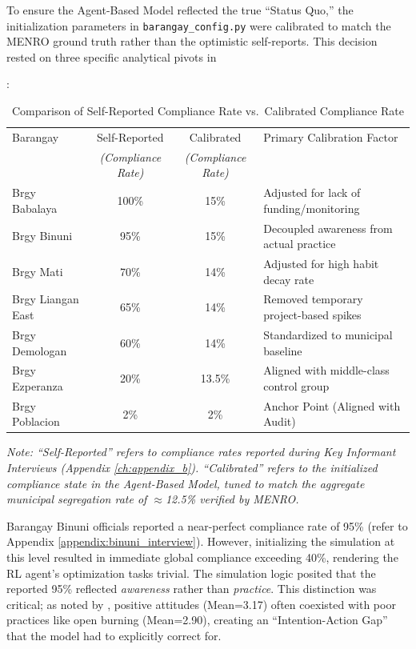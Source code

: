 To ensure the Agent-Based Model reflected the true ``Status Quo,'' the initialization parameters in \texttt{barangay\_config.py} were calibrated to match the MENRO ground truth rather than the optimistic self-reports. This decision rested on three specific analytical pivots in \begin{table}

\end{table}:

\begin{table}[htbp]
    \centering
    \caption{Comparison of Self-Reported Compliance Rate vs.\ Calibrated Compliance Rate}
    \label{tab:calibration_data}
    \small
    \begin{tabular}{l c c p{5cm}}
        \toprule
        Barangay & Self-Reported & Calibrated & Primary Calibration Factor \\
         & \textit{(Compliance Rate)} & \textit{(Compliance Rate)} & \\
        \midrule
        Brgy Babalaya     & 100\% & 15\% & Adjusted for lack of funding/monitoring \\
        Brgy Binuni       & 95\%  & 15\% & Decoupled awareness from actual practice \\
        Brgy Mati         & 70\%  & 14\% & Adjusted for high habit decay rate \\
        Brgy Liangan East & 65\%  & 14\% & Removed temporary project-based spikes \\
        Brgy Demologan    & 60\%  & 14\% & Standardized to municipal baseline \\
        Brgy Ezperanza    & 20\%  & 13.5\% & Aligned with middle-class control group \\
        Brgy Poblacion    & 2\%   & 2\%  & Anchor Point (Aligned with Audit) \\
        \bottomrule
    \end{tabular}
    
    \vspace{1ex}
    \raggedright
    \footnotesize
    \textit{Note: ``Self-Reported'' refers to compliance rates reported during Key Informant Interviews (Appendix \ref{ch:appendix_b}). ``Calibrated'' refers to the initialized compliance state in the Agent-Based Model, tuned to match the aggregate municipal segregation rate of $\approx$12.5\% verified by MENRO.}
\end{table}

Barangay Binuni officials reported a near-perfect compliance rate of 95\% (refer to Appendix \ref{appendix:binuni_interview}). However, initializing the simulation at this level resulted in immediate global compliance exceeding 40\%, rendering the RL agent’s optimization tasks trivial. The simulation logic posited that the reported 95\% reflected \textit{awareness} rather than \textit{practice}. This distinction was critical; as noted by \cite{Paigalan2025}, positive attitudes (Mean=3.17) often coexisted with poor practices like open burning (Mean=2.90), creating an ``Intention-Action Gap'' that the model had to explicitly correct for.

